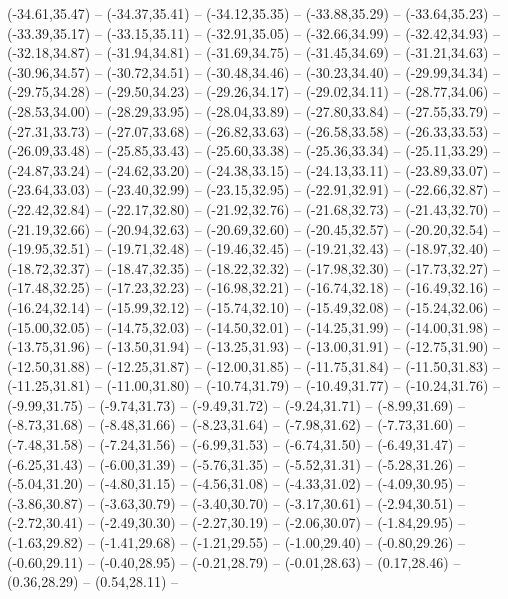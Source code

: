 {  (-34.61,35.47) -- (-34.37,35.41) -- (-34.12,35.35) -- (-33.88,35.29) -- (-33.64,35.23) -- (-33.39,35.17) -- (-33.15,35.11) --
  (-32.91,35.05) -- (-32.66,34.99) -- (-32.42,34.93) -- (-32.18,34.87) -- (-31.94,34.81) -- (-31.69,34.75) -- (-31.45,34.69) --
  (-31.21,34.63) -- (-30.96,34.57) -- (-30.72,34.51) -- (-30.48,34.46) -- (-30.23,34.40) -- (-29.99,34.34) -- (-29.75,34.28) --
  (-29.50,34.23) -- (-29.26,34.17) -- (-29.02,34.11) -- (-28.77,34.06) -- (-28.53,34.00) -- (-28.29,33.95) -- (-28.04,33.89) --
  (-27.80,33.84) -- (-27.55,33.79) -- (-27.31,33.73) -- (-27.07,33.68) -- (-26.82,33.63) -- (-26.58,33.58) -- (-26.33,33.53) --
  (-26.09,33.48) -- (-25.85,33.43) -- (-25.60,33.38) -- (-25.36,33.34) -- (-25.11,33.29) -- (-24.87,33.24) -- (-24.62,33.20) --
  (-24.38,33.15) -- (-24.13,33.11) -- (-23.89,33.07) -- (-23.64,33.03) -- (-23.40,32.99) -- (-23.15,32.95) -- (-22.91,32.91) --
  (-22.66,32.87) -- (-22.42,32.84) -- (-22.17,32.80) -- (-21.92,32.76) -- (-21.68,32.73) -- (-21.43,32.70) -- (-21.19,32.66) --
  (-20.94,32.63) -- (-20.69,32.60) -- (-20.45,32.57) -- (-20.20,32.54) -- (-19.95,32.51) -- (-19.71,32.48) -- (-19.46,32.45) --
  (-19.21,32.43) -- (-18.97,32.40) -- (-18.72,32.37) -- (-18.47,32.35) -- (-18.22,32.32) -- (-17.98,32.30) -- (-17.73,32.27) --
  (-17.48,32.25) -- (-17.23,32.23) -- (-16.98,32.21) -- (-16.74,32.18) -- (-16.49,32.16) -- (-16.24,32.14) -- (-15.99,32.12) --
  (-15.74,32.10) -- (-15.49,32.08) -- (-15.24,32.06) -- (-15.00,32.05) -- (-14.75,32.03) -- (-14.50,32.01) -- (-14.25,31.99) --
  (-14.00,31.98) -- (-13.75,31.96) -- (-13.50,31.94) -- (-13.25,31.93) -- (-13.00,31.91) -- (-12.75,31.90) -- (-12.50,31.88) --
  (-12.25,31.87) -- (-12.00,31.85) -- (-11.75,31.84) -- (-11.50,31.83) -- (-11.25,31.81) -- (-11.00,31.80) -- (-10.74,31.79) --
  (-10.49,31.77) -- (-10.24,31.76) -- (-9.99,31.75) -- (-9.74,31.73) -- (-9.49,31.72) -- (-9.24,31.71) -- (-8.99,31.69) --
  (-8.73,31.68) -- (-8.48,31.66) -- (-8.23,31.64) -- (-7.98,31.62) -- (-7.73,31.60) -- (-7.48,31.58) -- (-7.24,31.56) --
  (-6.99,31.53) -- (-6.74,31.50) -- (-6.49,31.47) -- (-6.25,31.43) -- (-6.00,31.39) -- (-5.76,31.35) -- (-5.52,31.31) --
  (-5.28,31.26) -- (-5.04,31.20) -- (-4.80,31.15) -- (-4.56,31.08) -- (-4.33,31.02) -- (-4.09,30.95) -- (-3.86,30.87) --
  (-3.63,30.79) -- (-3.40,30.70) -- (-3.17,30.61) -- (-2.94,30.51) -- (-2.72,30.41) -- (-2.49,30.30) -- (-2.27,30.19) --
  (-2.06,30.07) -- (-1.84,29.95) -- (-1.63,29.82) -- (-1.41,29.68) -- (-1.21,29.55) -- (-1.00,29.40) -- (-0.80,29.26) --
  (-0.60,29.11) -- (-0.40,28.95) -- (-0.21,28.79) -- (-0.01,28.63) -- (0.17,28.46) -- (0.36,28.29) -- (0.54,28.11) --
}
